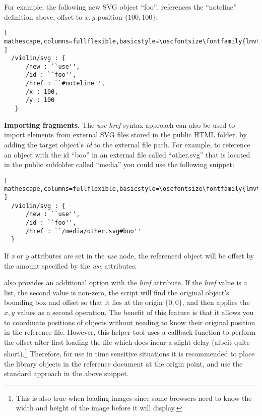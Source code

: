 For example, the following new SVG object ``foo'', references the ``noteline'' definition above, offset to ${x,y}$ position $\{100,100\}$:

\begin{minipage}{\linewidth}
\begin{lstlisting}[ mathescape,columns=fullflexible,basicstyle=\oscfontsize\fontfamily{lmvtt}\selectfont ]
  /violin/svg : {
      /new : ``use'',
      /id : ``foo'',
      /href : ``#noteline'',
      /x : 100,
      /y : 100
   }
 \end{lstlisting}
\end{minipage}

\medskip
\noindent
\textbf{Importing fragments.} 
The \textit{use}-\textit{href} syntax approach can also be used to import elements from external SVG files stored in the public HTML folder, by adding the target object's \textit{id} to the external file path.
For example, to reference an object with the id ``boo'' in an external file called ``other.svg'' that is located in the public subfolder called ``media'' you could use the following snippet:

\begin{lstlisting}[ mathescape,columns=fullflexible,basicstyle=\oscfontsize\fontfamily{lmvtt}\selectfont ]
  /violin/svg : {
      /new : ``use'',
      /id : ``foo'',
      /href : ``/media/other.svg#boo''
  }
 \end{lstlisting}

If \textit{x} or \textit{y} attributes are set in the \textit{use} node, the referenced object will be offset by the amount specified by the  \textit{use} attributes.

\drawsocket also provides an additional option with the \textit{href} attribute. If the \textit{href} value is a list, the second value is non-zero, the script will find the original object's bounding box and offset so that it lies at the origin $\{0,0\}$, and then applies the ${x,y}$ values as a second operation. The benefit of this feature is that it allows you to coordinate positions of objects without needing to know their original position in the reference file. However, this helper tool uses a callback function to perform the offset after first loading the file which does incur a slight delay (albeit quite short).\footnote{This is also true when loading images since some browsers need to know the width and height of the image before it will display.}
Therefore, for use in time sensitive situations it is recommended to place the library objects in the reference document at the origin point, and use the standard approach in the above snippet.

